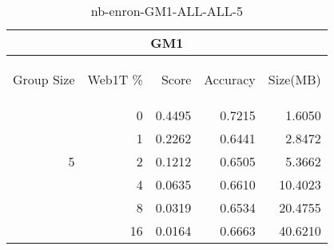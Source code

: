 \begin{center}
\begin{table}[htbp] 
 \begin{center}
\begin{tabular}{ | r | r | r | r | r |}
\hline
\multicolumn{5}{|c|}{GM1}\\
\hline
\begin{sideways}Group Size\end{sideways} & \begin{sideways}Web1T \%\end{sideways} & \begin{sideways}Score\end{sideways} & \begin{sideways}Accuracy\end{sideways} & \begin{sideways}Size(MB)\end{sideways}\\
\hline
\multirow{5}{*}{5}
 & 0 & 0.4495 & 0.7215 & 1.6050\\ \cline{2-5}
 & 1 & 0.2262 & 0.6441 & 2.8472\\ \cline{2-5}
 & 2 & 0.1212 & 0.6505 & 5.3662\\ \cline{2-5}
 & 4 & 0.0635 & 0.6610 & 10.4023\\ \cline{2-5}
 & 8 & 0.0319 & 0.6534 & 20.4755\\ \cline{2-5}
 & 16 & 0.0164 & 0.6663 & 40.6210\\ \cline{2-5}
\hline
\end{tabular}
\caption{nb-enron-GM1-ALL-ALL-5}
\label{table:nb-enron-GM1-ALL-ALL-5}
\end{center}
 \end{table}
\end{center}

